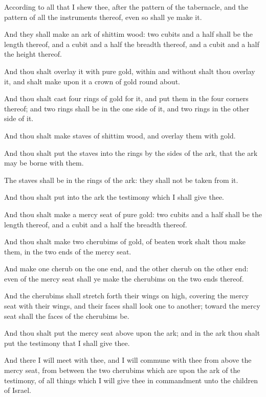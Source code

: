 \verse According to all that I shew thee, after the pattern of the tabernacle, and the pattern of all the instruments thereof, even so shall ye make it.

\verse And they shall make an ark of shittim wood: two cubits and a half shall be the length thereof, and a cubit and a half the breadth thereof, and a cubit and a half the height thereof.

\verse And thou shalt overlay it with pure gold, within and without shalt thou overlay it, and shalt make upon it a crown of gold round about.

\verse And thou shalt cast four rings of gold for it, and put them in the four corners thereof; and two rings shall be in the one side of it, and two rings in the other side of it.

\verse And thou shalt make staves of shittim wood, and overlay them with gold.

\verse And thou shalt put the staves into the rings by the sides of the ark, that the ark may be borne with them.

\verse The staves shall be in the rings of the ark: they shall not be taken from it.

\verse And thou shalt put into the ark the testimony which I shall give thee.

\verse And thou shalt make a mercy seat of pure gold: two cubits and a half shall be the length thereof, and a cubit and a half the breadth thereof.

\verse And thou shalt make two cherubims of gold, of beaten work shalt thou make them, in the two ends of the mercy seat.

\verse And make one cherub on the one end, and the other cherub on the other end: even of the mercy seat shall ye make the cherubims on the two ends thereof.

\verse And the cherubims shall stretch forth their wings on high, covering the mercy seat with their wings, and their faces shall look one to another; toward the mercy seat shall the faces of the cherubims be.

\verse And thou shalt put the mercy seat above upon the ark; and in the ark thou shalt put the testimony that I shall give thee.

\verse And there I will meet with thee, and I will commune with thee from above the mercy seat, from between the two cherubims which are upon the ark of the testimony, of all things which I will give thee in commandment unto the children of Israel.

